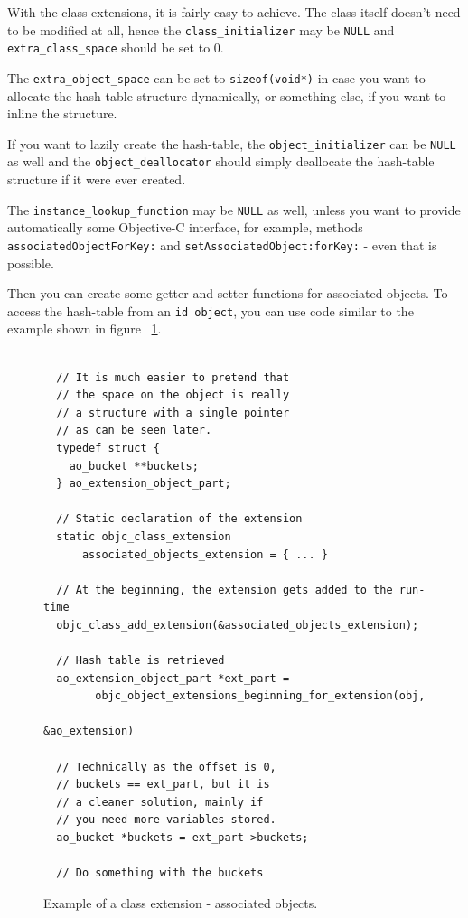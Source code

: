 With the class extensions, it is fairly easy to achieve. The class itself doesn't need to be modified at all, hence the \verb=class_initializer= may be \verb=NULL= and \verb=extra_class_space= should be set to 0.

The \verb=extra_object_space= can be set to \verb=sizeof(void*)= in case you want to allocate the hash-table structure dynamically, or something else, if you want to inline the structure.

If you want to lazily create the hash-table, the \verb=object_initializer= can be \verb=NULL= as well and the \verb=object_deallocator= should simply deallocate the hash-table structure if it were ever created.

The \verb=instance_lookup_function= may be \verb=NULL= as well, unless you want to provide automatically some Objective-C interface, for example, methods \newline{}\verb=associatedObjectForKey:= and \verb=setAssociatedObject:forKey:= - even that is possible.

Then you can create some getter and setter functions for associated objects. To access the hash-table from an \verb=id object=, you can use code similar to the example shown in figure ~\ref{fig:class_ext_ao}.

\begin{figure}[H] 
\begin{verbatim}
  
  // It is much easier to pretend that
  // the space on the object is really
  // a structure with a single pointer
  // as can be seen later.
  typedef struct {
    ao_bucket **buckets;
  } ao_extension_object_part;
  
  // Static declaration of the extension
  static objc_class_extension 
      associated_objects_extension = { ... }

  // At the beginning, the extension gets added to the run-time
  objc_class_add_extension(&associated_objects_extension);

  // Hash table is retrieved
  ao_extension_object_part *ext_part = 
        objc_object_extensions_beginning_for_extension(obj, 
                                                      &ao_extension)

  // Technically as the offset is 0,
  // buckets == ext_part, but it is
  // a cleaner solution, mainly if
  // you need more variables stored.
  ao_bucket *buckets = ext_part->buckets;
        
  // Do something with the buckets
\end{verbatim}
  \centering{}
  \caption{Example of a class extension - associated objects.}
  \label{fig:class_ext_ao}
\end{figure}


